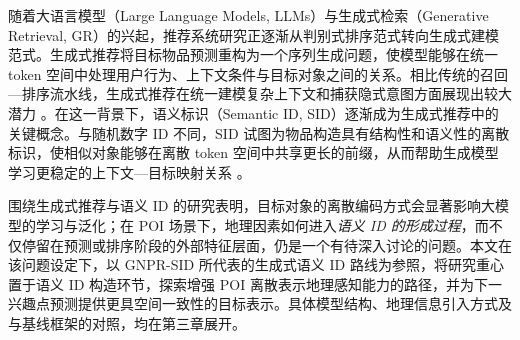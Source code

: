 随着大语言模型（Large Language Models, LLMs）与生成式检索（Generative Retrieval, GR）的兴起，推荐系统研究正逐渐从判别式排序范式转向生成式建模范式。生成式推荐将目标物品预测重构为一个序列生成问题，使模型能够在统一 token 空间中处理用户行为、上下文条件与目标对象之间的关系。相比传统的召回---排序流水线，生成式推荐在统一建模复杂上下文和捕获隐式意图方面展现出较大潜力 \cite{wang2023genrecsurvey,rajput2023tiger,li2023llmgenrecsurvey}。在这一背景下，语义标识（Semantic ID, SID）逐渐成为生成式推荐中的关键概念。与随机数字 ID 不同，SID 试图为物品构造具有结构性和语义性的离散标识，使相似对象能够在离散 token 空间中共享更长的前缀，从而帮助生成模型学习更稳定的上下文---目标映射关系 \cite{rajput2023tiger}。



围绕生成式推荐与语义 ID 的研究表明，目标对象的离散编码方式会显著影响大模型的学习与泛化；在 POI 场景下，地理因素如何进入\emph{语义 ID 的形成过程}，而不仅停留在预测或排序阶段的外部特征层面，仍是一个有待深入讨论的问题。本文在该问题设定下，以 GNPR-SID 所代表的生成式语义 ID 路线为参照，将研究重心置于语义 ID 构造环节，探索增强 POI 离散表示地理感知能力的路径，并为下一兴趣点预测提供更具空间一致性的目标表示。具体模型结构、地理信息引入方式及与基线框架的对照，均在第三章展开。


